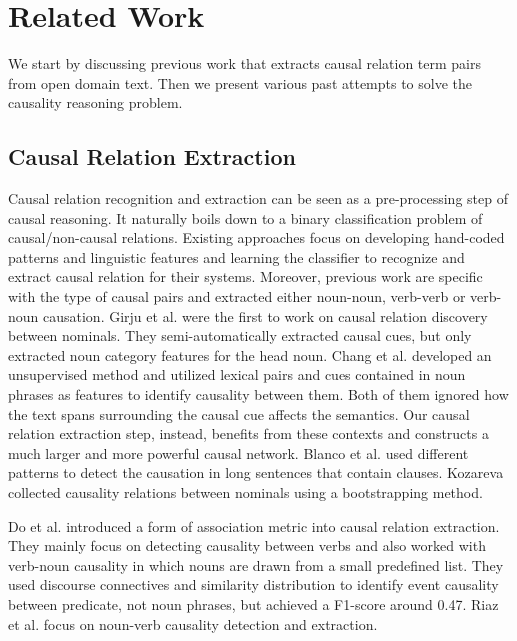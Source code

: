 \documentclass[letterpaper]{article}
\newcommand{\cut}[1]{}
\begin{document}
% 
\section{Related Work}
\label{sec:related}

We start by discussing previous work that extracts causal relation term
pairs from open domain text. Then we present various past attempts to
solve the causality reasoning problem.
\cut{We start by discussing previous work that extracts causal relation term pairs
from open domain text.
Then we present various past attempts
to solve the commonsense causal reasoning problem.
}

\subsection{Causal Relation Extraction}
Causal relation recognition and extraction
can be seen as a pre-processing step of causal reasoning.
It naturally boils down to a binary classification problem of
causal/non-causal relations. Existing approaches focus on developing
hand-coded patterns and linguistic features and learning the
classifier to recognize and extract causal relation for their
systems.
Moreover, previous work are specific with
the type of causal pairs and extracted either
noun-noun, verb-verb or verb-noun causation.
Girju et al. \cite{girju2003automatic} were the first to work on
causal relation discovery
between nominals. They semi-automatically extracted causal cues, but only
extracted noun category features for the head noun. Chang et al.
\cite{ChangC04} developed an unsupervised method and
utilized lexical pairs and cues contained in noun phrases as
features to identify causality between them. Both of them ignored
how the text spans surrounding the causal cue
affects the semantics.  Our causal relation extraction
step, instead,  benefits from these contexts and
constructs a much larger and more powerful causal network.
Blanco et al. \cite{blanco2008causal} used
different patterns to detect the causation in long sentences that
contain clauses.
Kozareva~\cite{kozareva2012cause} collected causality relations
between nominals using a bootstrapping method.

Do et al. \cite{do2011minimally} introduced a form of association
metric into causal relation extraction. They mainly focus on
detecting causality between verbs and also worked with verb-noun
causality in which nouns are drawn from a small predefined list.
They used discourse connectives and similarity distribution to
identify event causality between predicate, not noun phrases, but
achieved a F1-score around 0.47. Riaz et al.
\cite{riaz2014recognizing} focus on noun-verb causality detection
and extraction.
\end{document}
